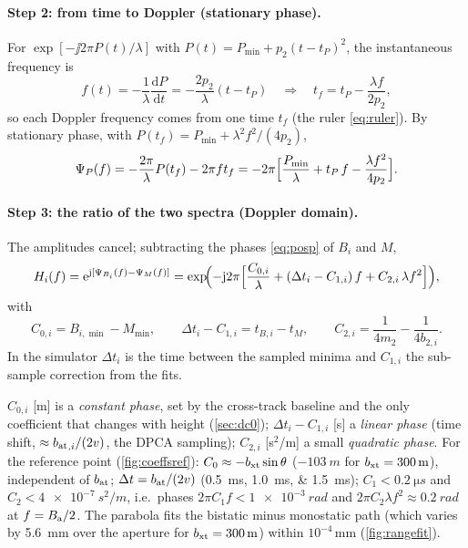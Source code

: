 \paragraph{Step 2: from time to Doppler (stationary phase).} For $\exp[-\jj2\pi P(t)/\lambda]$ with
$P(t)=P_{\min}+p_2(t-t_P)^2$, the instantaneous frequency is
\begin{equation}
  f(t)=-\frac{1}{\lambda}\frac{\mathrm dP}{\mathrm dt}=-\frac{2p_2}{\lambda}(t-t_P)
  \quad\Longrightarrow\quad t_f=t_P-\frac{\lambda f}{2p_2},
\end{equation}
so each Doppler frequency comes from one time $t_f$ (the ruler \eqref{eq:ruler}). By stationary phase, with
$P(t_f)=P_{\min}+\lambda^2f^2/(4p_2)$,
\begin{equation}
  \Psi_P(f) = -\frac{2\pi}{\lambda}P(t_f)-2\pi f t_f
  = -2\pi\Bigl[\frac{P_{\min}}{\lambda}+t_P\,f-\frac{\lambda f^2}{4p_2}\Bigr].
  \label{eq:posp}
\end{equation}
\paragraph{Step 3: the ratio of the two spectra (Doppler domain).} The amplitudes cancel; subtracting the phases
\eqref{eq:posp} of $B_i$ and $M$,
\begin{equation}
  H_i(f)=\mathrm{e}^{\mathrm{j}[\Psi_{B_i}(f)-\Psi_M(f)]}
  =\exp\!\Bigl(-\mathrm{j}2\pi\Bigl[\frac{C_{0,i}}{\lambda}+(\Delta t_i-C_{1,i})\,f+C_{2,i}\,\lambda f^2\Bigr]\Bigr),
  \label{eq:Hi}
\end{equation}
with
\begin{equation}
  C_{0,i}=B_{i,\min}-M_{\min},\qquad
  \Delta t_i-C_{1,i}=t_{B,i}-t_M,\qquad
  C_{2,i}=\frac{1}{4m_2}-\frac{1}{4b_{2,i}} .
  \label{eq:coeffs}
\end{equation}
In the simulator $\Delta t_i$ is the time between the sampled minima and $C_{1,i}$ the sub-sample correction from the fits.

$C_{0,i}$ [m] is a \emph{constant phase}, set by the cross-track baseline and the only coefficient that changes with
height (\cref{sec:dc0}); $\Delta t_i-C_{1,i}$ [s] a \emph{linear phase} (time shift, $\approx{b_{\mathrm{at}}}_{,i}/(2v)$, the DPCA
sampling); $C_{2,i}$ [s$^2$/m] a small \emph{quadratic phase}. For the reference point (\cref{fig:coeffsref}):
$C_0\approx-{b_{\mathrm{xt}}}\sin\theta$ ($\SI{-103}{m}$ for ${b_{\mathrm{xt}}}=\SI{300}{m}$), independent of ${b_{\mathrm{at}}}$; $\Delta t={b_{\mathrm{at}}}/(2v)$
(\SIlist{0.5;1.0;1.5}{ms}); $C_1<\SI{0.2}{\micro s}$ and $C_2<\SI{4e-7}{s^2/m}$, i.e.\ phases $2\pi C_1 f<\SI{1e-3}{rad}$
and $2\pi C_2\lambda f^2\approx\SI{0.2}{rad}$ at $f=B_{\mathrm{a}}/2$. The parabola fits the bistatic minus monostatic path (which
varies by \SI{5.6}{mm} over the aperture for ${b_{\mathrm{xt}}}=\SI{300}{m}$) within $10^{-4}$\,\si{mm} (\cref{fig:rangefit}).

